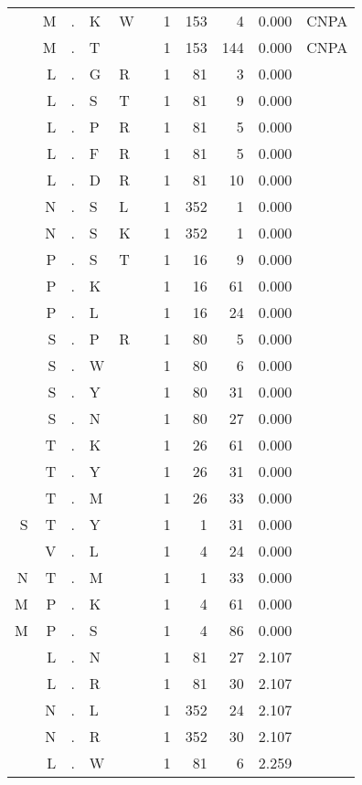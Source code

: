 \begin{longtable}{r@{ } r@{ } c@{ } l@{ } l@{ } l@{ } r r r r l }
  & M & . & K & W &   & 1 & 153 & 4 & 0.000 & \textsc{CNPA} \\
  & M & . & T &   &   & 1 & 153 & 144 & 0.000 & \textsc{CNPA} \\
  & L & . & G & R &   & 1 & 81 & 3 & 0.000 &  \\
  & L & . & S & T &   & 1 & 81 & 9 & 0.000 &  \\
  & L & . & P & R &   & 1 & 81 & 5 & 0.000 &  \\
  & L & . & F & R &   & 1 & 81 & 5 & 0.000 &  \\
  & L & . & D & R &   & 1 & 81 & 10 & 0.000 &  \\
  & N & . & S & L &   & 1 & 352 & 1 & 0.000 &  \\
  & N & . & S & K &   & 1 & 352 & 1 & 0.000 &  \\
  & P & . & S & T &   & 1 & 16 & 9 & 0.000 &  \\
  & P & . & K &   &   & 1 & 16 & 61 & 0.000 &  \\
  & P & . & L &   &   & 1 & 16 & 24 & 0.000 &  \\
  & S & . & P & R &   & 1 & 80 & 5 & 0.000 &  \\
  & S & . & W &   &   & 1 & 80 & 6 & 0.000 &  \\
  & S & . & Y &   &   & 1 & 80 & 31 & 0.000 &  \\
  & S & . & N &   &   & 1 & 80 & 27 & 0.000 &  \\
  & T & . & K &   &   & 1 & 26 & 61 & 0.000 &  \\
  & T & . & Y &   &   & 1 & 26 & 31 & 0.000 &  \\
  & T & . & M &   &   & 1 & 26 & 33 & 0.000 &  \\
S & T & . & Y &   &   & 1 & 1 & 31 & 0.000 &  \\
  & V & . & L &   &   & 1 & 4 & 24 & 0.000 &  \\
N & T & . & M &   &   & 1 & 1 & 33 & 0.000 &  \\
M & P & . & K &   &   & 1 & 4 & 61 & 0.000 &  \\
M & P & . & S &   &   & 1 & 4 & 86 & 0.000 &  \\
  & L & . & N &   &   & 1 & 81 & 27 & 2.107 &  \\
  & L & . & R &   &   & 1 & 81 & 30 & 2.107 &  \\
  & N & . & L &   &   & 1 & 352 & 24 & 2.107 &  \\
  & N & . & R &   &   & 1 & 352 & 30 & 2.107 &  \\
  & L & . & W &   &   & 1 & 81 & 6 & 2.259 &  \\

\end{longtable}
